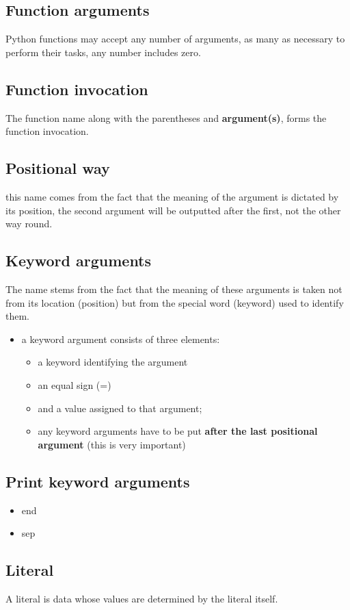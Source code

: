 \documentclass[11pt]{article}
\begin{document}
\subsection{Function arguments}
\label{sec:org0d11ba4}
Python functions may accept any number of arguments, as many as
necessary to perform their tasks, any number includes zero.
\subsection{Function invocation}
\label{sec:org8ab9498}
The function name along with the parentheses and \textbf{argument(s)}, forms
the function invocation.
\subsection{Positional way}
\label{sec:org7eb9004}
this name comes from the fact that the meaning of the argument is
dictated by its position, the second argument will be outputted after
the first, not the other way round.
\subsection{Keyword arguments}
\label{sec:org5136c56}
The name stems from the fact that the meaning of these arguments is
taken not from its location (position) but from the special word
(keyword) used to identify them.
\begin{itemize}
\item a keyword argument consists of three elements: 
\begin{itemize}
\item a keyword identifying the argument
\item an equal sign (=)
\item and a value assigned to that argument;
\item any keyword arguments have to be put \textbf{after the last positional
argument} (this is very important)
\end{itemize}
\end{itemize}
\subsection{Print keyword arguments}
\label{sec:orgff6d20f}
\begin{itemize}
\item end
\item sep
\end{itemize}
\subsection{Literal}
\label{sec:org3bc465f}
A literal is data whose values are determined by the literal itself.
\end{document}
